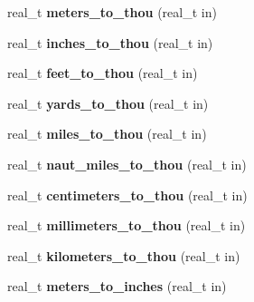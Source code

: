 \begin{DoxyCompactItemize}
\item 
\hypertarget{namespaceetk_a35349ad24f632025bf0ae26e37c924ff}{real\-\_\-t {\bfseries meters\-\_\-to\-\_\-thou} (real\-\_\-t in)}\label{namespaceetk_a35349ad24f632025bf0ae26e37c924ff}

\item 
\hypertarget{namespaceetk_a5f22a2845a521c74cc575cddd2015e92}{real\-\_\-t {\bfseries inches\-\_\-to\-\_\-thou} (real\-\_\-t in)}\label{namespaceetk_a5f22a2845a521c74cc575cddd2015e92}

\item 
\hypertarget{namespaceetk_a8aed63ea7f4598193ccd039d9ec14897}{real\-\_\-t {\bfseries feet\-\_\-to\-\_\-thou} (real\-\_\-t in)}\label{namespaceetk_a8aed63ea7f4598193ccd039d9ec14897}

\item 
\hypertarget{namespaceetk_af76ec55fc1f32ec0bc9ee0285f1c15a2}{real\-\_\-t {\bfseries yards\-\_\-to\-\_\-thou} (real\-\_\-t in)}\label{namespaceetk_af76ec55fc1f32ec0bc9ee0285f1c15a2}

\item 
\hypertarget{namespaceetk_a27401490692081a9f30aa064e5cbf336}{real\-\_\-t {\bfseries miles\-\_\-to\-\_\-thou} (real\-\_\-t in)}\label{namespaceetk_a27401490692081a9f30aa064e5cbf336}

\item 
\hypertarget{namespaceetk_a5ab81e0f6e72b7ffe49689bd5d16a51a}{real\-\_\-t {\bfseries naut\-\_\-miles\-\_\-to\-\_\-thou} (real\-\_\-t in)}\label{namespaceetk_a5ab81e0f6e72b7ffe49689bd5d16a51a}

\item 
\hypertarget{namespaceetk_aacc56fa19412972dd4e4ba8433f21f9a}{real\-\_\-t {\bfseries centimeters\-\_\-to\-\_\-thou} (real\-\_\-t in)}\label{namespaceetk_aacc56fa19412972dd4e4ba8433f21f9a}

\item 
\hypertarget{namespaceetk_a83b38f33b76f70f1877d34963087943c}{real\-\_\-t {\bfseries millimeters\-\_\-to\-\_\-thou} (real\-\_\-t in)}\label{namespaceetk_a83b38f33b76f70f1877d34963087943c}

\item 
\hypertarget{namespaceetk_ad8aa5096d1539cf2564133bea14f4d41}{real\-\_\-t {\bfseries kilometers\-\_\-to\-\_\-thou} (real\-\_\-t in)}\label{namespaceetk_ad8aa5096d1539cf2564133bea14f4d41}

\item 
\hypertarget{namespaceetk_af579c5a9dfcc3a0819eac1f9c17d50c4}{real\-\_\-t {\bfseries meters\-\_\-to\-\_\-inches} (real\-\_\-t in)}\label{namespaceetk_af579c5a9dfcc3a0819eac1f9c17d50c4}


\end{DoxyCompactItemize}

